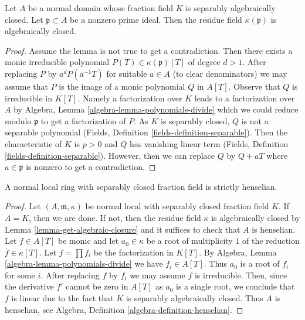 \begin{lemma}
\label{lemma-get-algebraic-closure}
Let $A$ be a normal domain whose fraction field $K$ is separably algebraically
closed. Let $\mathfrak p \subset A$ be a nonzero prime ideal.
Then the residue field $\kappa(\mathfrak p)$ is algebraically closed.
\end{lemma}

\begin{proof}
Assume the lemma is not true to get a contradiction. Then there exists a
monic irreducible polynomial $P(T) \in \kappa(\mathfrak p)[T]$ of
degree $d > 1$. After replacing $P$ by $a^d P(a^{-1}T)$ for suitable $a \in A$
(to clear denominators) we may assume that $P$ is the image of a
monic polynomial $Q$ in $A[T]$. Observe that $Q$ is irreducible in
$K[T]$. Namely a factorization over $K$ leads to a factorization
over $A$ by Algebra, Lemma \ref{algebra-lemma-polynomials-divide}
which we could reduce modulo $\mathfrak p$ to get a factorization of $P$.
As $K$ is separably closed, $Q$ is not a separable polynomial
(Fields, Definition \ref{fields-definition-separable}).
Then the characteristic of $K$ is $p > 0$ and $Q$ has
vanishing linear term (Fields, Definition \ref{fields-definition-separable}).
However, then we can replace $Q$ by
$Q + a T$ where $a \in \mathfrak p$ is nonzero to get a contradiction.
\end{proof}

\begin{lemma}
\label{lemma-normal-local-domain-separablly-closed-fraction-field}
A normal local ring with separably closed fraction field is
strictly henselian.
\end{lemma}

\begin{proof}
Let $(A, \mathfrak m, \kappa)$ be normal local with separably
closed fraction field $K$. If $A = K$, then we are done. If not,
then the residue field $\kappa$ is algebraically closed
by Lemma \ref{lemma-get-algebraic-closure} and it suffices to
check that $A$ is henselian.
Let $f \in A[T]$ be monic and let $a_0 \in \kappa$ be a root
of multiplicity $1$ of the reduction $\overline{f} \in \kappa[T]$.
Let $f = \prod f_i$ be the factorization in $K[T]$.
By Algebra, Lemma \ref{algebra-lemma-polynomials-divide} we have
$f_i \in A[T]$. Thus $a_0$ is a root of $f_i$ for some $i$.
After replacing $f$ by $f_i$ we may assume $f$ is irreducible.
Then, since the derivative $f'$ cannot be zero in $A[T]$
as $a_0$ is a single root, we conclude that $f$ is linear
due to the fact that $K$ is separably algebraically closed.
Thus $A$ is henselian, see
Algebra, Definition \ref{algebra-definition-henselian}.
\end{proof}

